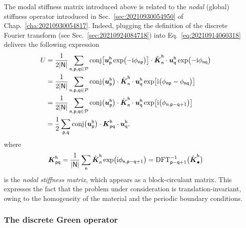 The modal stiffness matrix introduced above is related to the \emph{nodal}
(global) stiffness operator introduced in Sec.~\ref{sec:20210930054950} of
Chap.~\ref{cha:20210930054817}. Indeed, plugging the definition of the discrete
Fourier transform (see Sec.~\ref{sec:20210924084718}) into
Eq. \eqref{eq:20210914060318} delivers the following expression
\begin{equation}
  \begin{aligned}[b]
    U={}&\frac1{2\lvert\mathsf{N}\rvert}\sum_{\mathsf{n}, \mathsf{p}, \mathsf{q}\in\mathcal{P}}
    \operatorname{conj}\bigl[\boldsymbol u_\mathsf{p}^\mathsf{h}\exp\bigl(-\mathrm i\phi_\mathsf{np}\bigr)\bigr]
    \cdot\hat{\boldsymbol K}_\mathsf{n}^\mathsf{h}
    \cdot\boldsymbol u_\mathsf{q}^\mathsf{h}\exp\bigl(-\mathrm i\phi_\mathsf{nq}\bigr)\\
    ={}&\frac1{2\lvert\mathsf{N}\rvert}\sum_{\mathsf{n}, \mathsf{p}, \mathsf{q}\in\mathcal{P}}
    \operatorname{conj}\bigl(\boldsymbol u_\mathsf{p}^\mathsf{h}\bigr)
    \cdot\hat{\boldsymbol K}_\mathsf{n}^\mathsf{h}
    \cdot\boldsymbol u_\mathsf{q}^\mathsf{h}
    \exp\bigl[\mathrm i\bigl(\phi_\mathsf{np}-\phi_\mathsf{nq}\bigr)\bigr]\\
    ={}&\frac1{2\lvert\mathsf{N}\rvert}\sum_{\mathsf{n}, \mathsf{p}, \mathsf{q}\in\mathcal{P}}
    \operatorname{conj}\bigl(\boldsymbol u_\mathsf{p}^\mathsf{h}\bigr)
    \cdot\hat{\boldsymbol K}_\mathsf{n}^\mathsf{h}
    \cdot\boldsymbol u_\mathsf{q}^\mathsf{h}
    \exp\bigl[\mathrm i\bigl(\phi_{\mathsf{n}, \mathsf{p}-\mathsf{q}+1}\bigr)\bigr]\\
    ={}&\frac12\sum_{\mathsf{p},\mathsf{q}}
    \operatorname{conj}\bigl(\boldsymbol u_\mathsf{p}^\mathsf{h}\bigr)\cdot\boldsymbol K_\mathsf{pq}^\mathsf{h}
    \cdot\boldsymbol u_\mathsf{q}^\mathsf{h},
  \end{aligned}
\end{equation}
where
\begin{equation}
  \boldsymbol{K}_{\mathsf{pq}}^\mathsf{h}
  =\frac1{\lvert\mathsf{N}\rvert}\sum_{\mathsf{n}}
  \hat{\boldsymbol K}_\mathsf{n}^\mathsf{h}
  \exp\bigl(\mathrm i\phi_{\mathsf{n},\mathsf{p}-\mathsf{q}+1}\bigr)
  =\operatorname{DFT}_{\mathsf{p}-\mathsf{q}+1}^{-1}\bigl(\hat{\boldsymbol K}_\mathsf{\bullet}^\mathsf{h}\bigr)
\end{equation}
is the \emph{nodal stiffness matrix}, which appears as a block-circulant
matrix. This expresses the fact that the problem under consideration is
translation-invariant, owing to the homogeneity of the material and the periodic
boundary conditions.

\subsubsection{The discrete Green operator}

